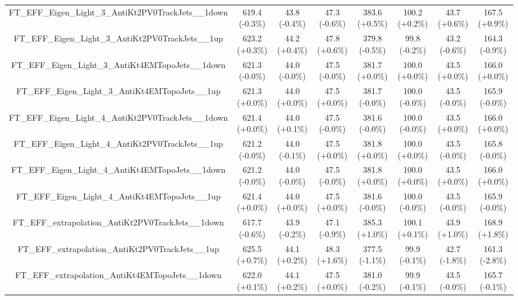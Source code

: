 \begin{table}[htbp!]
\begin{tiny}
\begin{center}
\begin{tabular}{c|c|c|c||c|c|c|c}
FT\_EFF\_Eigen\_Light\_3\_AntiKt2PV0TrackJets\_\_1down       & 619.4     (-0.3\%) & 43.8      (-0.4\%) & 47.3      (-0.6\%) & 383.6     (+0.5\%) & 100.2     (+0.2\%) & 43.7      (+0.6\%) & 167.5     (+0.9\%) \\ 
FT\_EFF\_Eigen\_Light\_3\_AntiKt2PV0TrackJets\_\_1up         & 623.2     (+0.3\%) & 44.2      (+0.4\%) & 47.8      (+0.6\%) & 379.8     (-0.5\%) & 99.8      (-0.2\%) & 43.2      (-0.6\%) & 164.3     (-0.9\%) \\ 
FT\_EFF\_Eigen\_Light\_3\_AntiKt4EMTopoJets\_\_1down         & 621.3     (-0.0\%) & 44.0      (-0.0\%) & 47.5      (-0.0\%) & 381.7     (+0.0\%) & 100.0     (+0.0\%) & 43.5      (+0.0\%) & 166.0     (+0.0\%) \\ 
FT\_EFF\_Eigen\_Light\_3\_AntiKt4EMTopoJets\_\_1up           & 621.3     (+0.0\%) & 44.0      (+0.0\%) & 47.5      (+0.0\%) & 381.7     (-0.0\%) & 100.0     (-0.0\%) & 43.5      (-0.0\%) & 165.9     (-0.0\%) \\ 
FT\_EFF\_Eigen\_Light\_4\_AntiKt2PV0TrackJets\_\_1down       & 621.4     (+0.0\%) & 44.0      (+0.1\%) & 47.5      (-0.0\%) & 381.6     (-0.0\%) & 100.0     (-0.0\%) & 43.5      (+0.0\%) & 166.0     (+0.0\%) \\ 
FT\_EFF\_Eigen\_Light\_4\_AntiKt2PV0TrackJets\_\_1up         & 621.2     (-0.0\%) & 44.0      (-0.1\%) & 47.5      (+0.0\%) & 381.8     (+0.0\%) & 100.0     (+0.0\%) & 43.5      (-0.0\%) & 165.8     (-0.0\%) \\ 
FT\_EFF\_Eigen\_Light\_4\_AntiKt4EMTopoJets\_\_1down         & 621.2     (-0.0\%) & 44.0      (-0.0\%) & 47.5      (-0.0\%) & 381.8     (+0.0\%) & 100.0     (+0.0\%) & 43.5      (+0.0\%) & 166.0     (+0.0\%) \\ 
FT\_EFF\_Eigen\_Light\_4\_AntiKt4EMTopoJets\_\_1up           & 621.4     (+0.0\%) & 44.0      (+0.0\%) & 47.5      (+0.0\%) & 381.6     (-0.0\%) & 100.0     (-0.0\%) & 43.5      (-0.0\%) & 165.9     (-0.0\%) \\ 
FT\_EFF\_extrapolation\_AntiKt2PV0TrackJets\_\_1down         & 617.7     (-0.6\%) & 43.9      (-0.2\%) & 47.1      (-0.9\%) & 385.3     (+1.0\%) & 100.1     (+0.1\%) & 43.9      (+1.0\%) & 168.9     (+1.8\%) \\ 
FT\_EFF\_extrapolation\_AntiKt2PV0TrackJets\_\_1up           & 625.5     (+0.7\%) & 44.1      (+0.2\%) & 48.3      (+1.6\%) & 377.5     (-1.1\%) & 99.9      (-0.1\%) & 42.7      (-1.8\%) & 161.3     (-2.8\%) \\ 
FT\_EFF\_extrapolation\_AntiKt4EMTopoJets\_\_1down           & 622.0     (+0.1\%) & 44.1      (+0.2\%) & 47.5      (+0.0\%) & 381.0     (-0.2\%) & 99.9      (-0.1\%) & 43.5      (-0.0\%) & 165.7     (-0.1\%) \\ 

\end{tabular}
\end{center}
\end{tiny}
\end{table}
